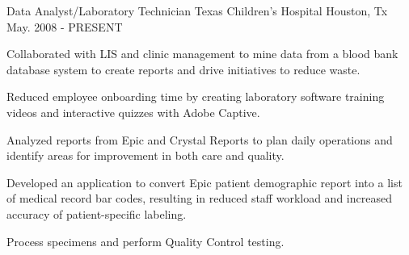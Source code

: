 

\begin{cventries}
	
	
	
	\cventry
	{Data Analyst/Laboratory Technician} %
	{Texas Children's Hospital} %
	{Houston, Tx} %
	{May. 2008 - PRESENT} %
	{
		\begin{cvitems} %
			\item {Collaborated with LIS and clinic management to mine data from a blood bank database system to create reports and drive initiatives to reduce waste.}
			\item {Reduced employee onboarding time by creating laboratory software training videos and interactive quizzes with Adobe Captive.}
			\item {Analyzed reports from Epic and Crystal Reports to plan daily operations and identify areas for improvement in both care and quality.}
			\item {Developed an application to convert Epic patient demographic report into a list of medical record bar codes, resulting in reduced staff workload and increased accuracy of patient-specific labeling.}
			\item {Process specimens and perform Quality Control testing.}
		\end{cvitems}
	}
	
	
\end{cventries}
